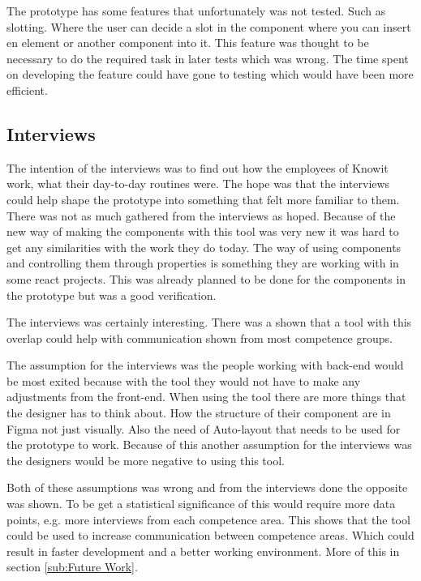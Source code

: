 The prototype has some features that unfortunately was not tested. Such as slotting. Where the user can decide a slot in the component where you can insert en element or another component into it. This feature was thought to be necessary to do the required task in later tests which was wrong. The time spent on developing the feature could have gone to testing which would have been more efficient.



\subsection{Interviews}%
\label{sub:Interviews}

The intention of the interviews was to find out how the employees of Knowit work, what their day-to-day routines were. The hope was that the interviews could help shape the prototype into something that felt more familiar to them. There was not as much gathered from the interviews as hoped. Because of the new way of making the components with this tool was very new it was hard to get any similarities with the work they do today. The way of using components and controlling them through properties is something they are working with in some react projects. This was already planned to be done for the components in the prototype but was a good verification.

The interviews was certainly interesting. There was a shown that a tool with this overlap could help with communication shown from most competence groups.

The assumption for the interviews was the people working with back-end would be most exited because with the tool they would not have to make any adjustments from the front-end. When using the tool there are more things that the designer has to think about. How the structure of their component are in Figma not just visually. Also the need of Auto-layout that needs to be used for the prototype to work. Because of this another assumption for the interviews was the designers would be more negative to using this tool. 

Both of these assumptions was wrong and from the interviews done the opposite was shown. To be get a statistical significance of this would require more data points, e.g. more interviews from each competence area. This shows that the tool could be used to increase communication between competence areas. Which could result in faster development and a better working environment. More of this in section \ref{sub:Future Work}.

